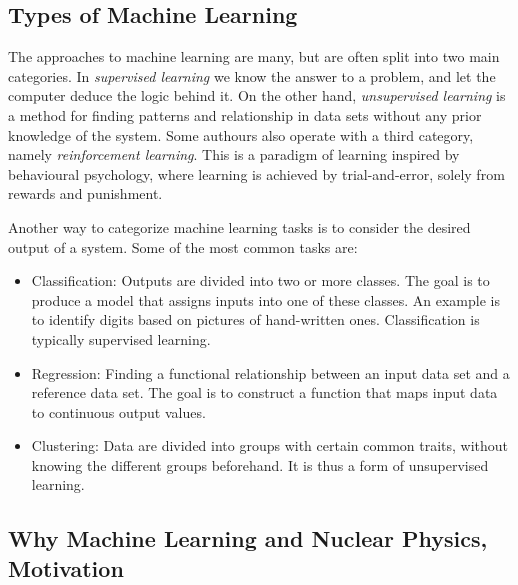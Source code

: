\documentclass[%
oneside,                 %
final,                   %
10pt]{article}
\newenvironment{block_mdfboxadmon}[1][]{
\begin{block_mdfboxmdframed}[frametitle=#1]
}
{
\end{block_mdfboxmdframed}
}
\begin{document}
\subsection{Types of Machine Learning}


\begin{block_mdfboxadmon}[]
The approaches to machine learning are many, but are often split into two main categories. 
In \emph{supervised learning} we know the answer to a problem,
and let the computer deduce the logic behind it. On the other hand, \emph{unsupervised learning}
is a method for finding patterns and relationship in data sets without any prior knowledge of the system.
Some authours also operate with a third category, namely \emph{reinforcement learning}. This is a paradigm 
of learning inspired by behavioural psychology, where learning is achieved by trial-and-error, 
solely from rewards and punishment.

Another way to categorize machine learning tasks is to consider the desired output of a system.
Some of the most common tasks are:

\begin{itemize}
  \item Classification: Outputs are divided into two or more classes. The goal is to   produce a model that assigns inputs into one of these classes. An example is to identify  digits based on pictures of hand-written ones. Classification is typically supervised learning.

  \item Regression: Finding a functional relationship between an input data set and a reference data set.   The goal is to construct a function that maps input data to continuous output values.

  \item Clustering: Data are divided into groups with certain common traits, without knowing the different groups beforehand.  It is thus a form of unsupervised learning.
\end{itemize}

\noindent
\end{block_mdfboxadmon} %




\subsection{Why Machine Learning and Nuclear Physics, Motivation}
\end{document}
